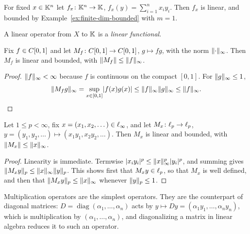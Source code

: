 \begin{example}\label{ex:fx}
For fixed $x \in \mathbb{K}^n$ let $f_x \colon \mathbb{K}^n \to \mathbb{K}$,
$f_x(y) = \sum_{i=1}^{n} x_i y_i$. Then $f_x$ is linear, and bounded by
Example~\ref{ex:finite-dim-bounded} with $m = 1$.
\end{example}

\begin{definition}\label{def:functional}
A linear operator from $X$ to $\mathbb{K}$ is a \emph{linear functional}.
\end{definition}

\begin{example}\label{ex:mult-C}
Fix $f \in C[0,1]$ and let $M_f \colon C[0,1] \to C[0,1]$,
$g \mapsto f g$, with the norm $\lVert\cdot\rVert_\infty$. Then $M_f$ is linear
and bounded, with $\lVert M_f\rVert \le \lVert f\rVert_\infty$.
\end{example}

\begin{proof}
$\lVert f\rVert_\infty < \infty$ because $f$ is continuous on the compact $[0,1]$.
For $\lVert g\rVert_\infty \le 1$,
\[
  \lVert M_f g\rVert_\infty = \sup_{x \in [0,1]} \lvert f(x) g(x)\rvert
  \le \lVert f\rVert_\infty \lVert g\rVert_\infty \le \lVert f\rVert_\infty . \qedhere
\]
\end{proof}

\begin{example}\label{ex:mult-lp}
Let $1 \le p < \infty$, fix $x = (x_1, x_2, \dots) \in \ell_{\infty}$, and let
$M_x \colon \ell_{p} \to \ell_{p}$,
$y = (y_1, y_2, \dots) \mapsto (x_1 y_1, x_2 y_2, \dots)$. Then $M_x$ is
linear and bounded, with $\lVert M_x\rVert \le \lVert x\rVert_\infty$.
\end{example}

\begin{proof}
Linearity is immediate. Termwise
$\lvert x_i y_i\rvert^p \le \lVert x\rVert_\infty^p \lvert y_i\rvert^p$, and summing gives
$\lVert M_x y\rVert_p \le \lVert x\rVert_\infty \lVert y\rVert_p$. This shows first that
$M_x y \in \ell_{p}$, so that $M_x$ is well defined, and then that
$\lVert M_x y\rVert_p \le \lVert x\rVert_\infty$ whenever $\lVert y\rVert_p \le 1$.
\end{proof}

\begin{remark}
Multiplication operators are the simplest operators. They are the
counterpart of diagonal matrices: $D = \operatorname{diag}(\alpha_1, \dots,
\alpha_n)$ acts by $y \mapsto Dy = (\alpha_1 y_1, \dots, \alpha_n y_n)$,
which is multiplication by $(\alpha_1, \dots, \alpha_n)$, and diagonalizing a
matrix in linear algebra reduces it to such an operator.
\end{remark}

